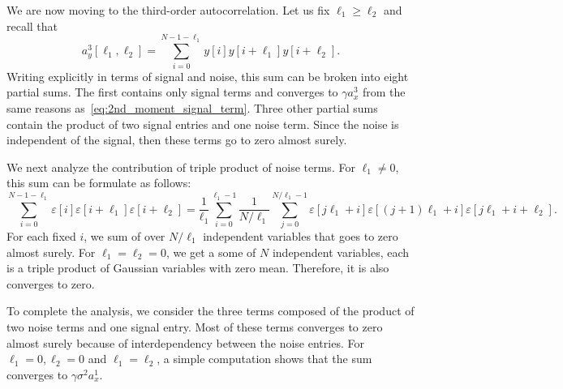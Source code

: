 \documentclass[english]{article}
\numberwithin{equation}{section}
\theoremstyle{plain}
\theoremstyle{definition}
\theoremstyle{remark}
\theoremstyle{plain}
\theoremstyle{remark}
\theoremstyle{plain}
\theoremstyle{plain}
\begin{document}
We are now moving to the third-order autocorrelation. Let us fix $\ell_1\geq\ell_2$ and recall that 
\begin{equation*}
a_y^3[\ell_1,\ell_2] = \sum_{i=0}^{N-1-\ell_1} y[i]y[i+\ell_1]y[i+\ell_2]. 
\end{equation*}
Writing explicitly in terms of signal and noise, this sum can be broken into eight partial sums. The first contains only signal terms and converges to $\gamma a_x^3$ from the same reasons as~\eqref{eq:2nd_moment_signal_term}. Three other partial sums contain the product of two signal entries and one noise term. Since the noise is independent of the signal, then these terms go to zero almost surely.

We next analyze the contribution of triple product of noise terms. For $\ell_1\neq 0$, this sum can be formulate as follows:
\begin{equation*}
\sum_{i=0}^{N-1-\ell_1} \varepsilon[i]\varepsilon[i+\ell_1]\varepsilon[i+\ell_2] = \frac{1}{\ell_1}\sum_{i=0}^{\ell_1-1}\frac{1}{N/\ell_1}\sum_{j=0}^{N/\ell_1 -1 }\varepsilon[j\ell_1+i]\varepsilon[(j+1)\ell_1+i]\varepsilon[j\ell_1+i+\ell_2].
\end{equation*}
For each fixed $i$, we sum of over $N/\ell_1$ independent variables that goes to zero almost surely. For $\ell_1=\ell_2=0$, we get a some of $N$ independent variables, each is a triple product of Gaussian variables with zero mean. Therefore, it is also converges to zero. 

To complete the analysis, we consider the three terms composed of the product of two noise terms and one signal entry. Most of these terms converges to zero almost surely because of interdependency between the noise entries. For $\ell_1=0, \ell_2=0$ and $\ell_1=\ell_2$,  a simple computation shows that the sum converges to $\gamma\sigma^2a_x^1$.
\end{document}
